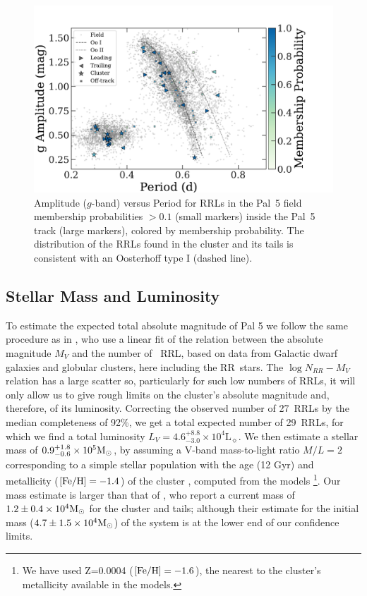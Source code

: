 \documentclass[twocolumn]{aastex63}
\begin{document}
\begin{figure}[t]
\begin{center}
\includegraphics[width=\textwidth]{rrls_PA.pdf}
\caption{Amplitude ($g$-band) versus Period for RRLs in the Pal~5 field membership probabilities $>0.1$ (small markers) inside the Pal~5 track (large markers), colored by membership probability. The distribution of the RRLs found in the cluster and its tails is consistent with an Oosterhoff type I (dashed line). }
\label{fig:PA_diagram}
\end{center}
\end{figure}

\subsection{Stellar Mass and Luminosity}

To estimate the expected total absolute magnitude of Pal 5 we follow the same procedure as in \citet{Mateu:2018}, who use a linear fit of the relation between the absolute magnitude $M_V$ and the number of \typeab\ RRL, based on data from Galactic dwarf galaxies and globular clusters, here including the RR\typec~stars.  The $\log{N_{RR}}-M_V$ relation has a large scatter so, particularly for such low numbers of RRLs, it will only allow us to give rough limits on the cluster's absolute magnitude and, therefore, of its luminosity. Correcting the observed number of 27~RRLs by the median completeness of 92\%, we get a total expected number of 29~RRLs, for which we find a total luminosity $L_V=4.6_{-3.0}^{+8.8}\times 10^4 \mathrm{L}_\sun$.
We then estimate a stellar mass of $0.9_{-0.6}^{+1.8}\times 10^5 \mathrm{M}_\odot$, by assuming a V-band mass-to-light ratio $M/L=2$ corresponding to a simple stellar population with the age (12 Gyr) and metallicity ($[\mathrm{Fe}/\mathrm{H}]=-1.4$) of the cluster \citep{Dotter:2011}, computed from the \citet{Bruzual:2003} models \footnote{We have used Z=0.0004 ($[\mathrm{Fe}/\mathrm{H}]=-1.6$), the nearest to the cluster's metallicity available in the models.}. Our mass estimate is larger than that of \citet{Ibata:2017}, who report a current mass of $1.2\pm 0.4 \times10^4\mathrm{M}_\odot$ for the cluster and tails; although their estimate for the initial mass ($4.7\pm 1.5\times10^4\mathrm{M}_\odot$) of the system is at the lower end of our confidence limits.
\end{document}
